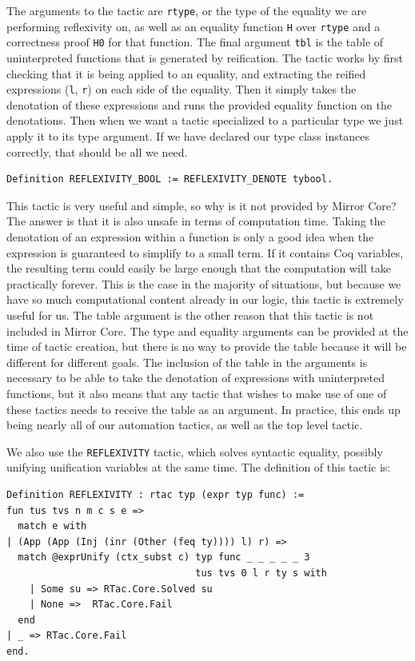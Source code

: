 \documentclass{puthesis}
\begin{document}
The arguments to the tactic are \lstinline|rtype|, or the type of the equality we are
performing reflexivity on, as well as an equality function \lstinline|H| over
\lstinline|rtype| and a correctness proof \lstinline|H0| for that function. The final
argument \lstinline|tbl| is the table of uninterpreted functions that is generated by reification.
 The
tactic works by first checking that it is being applied to an
equality, and extracting the reified expressions (\lstinline|l|, \lstinline|r|) on each side of the
equality. Then it simply takes the denotation of these expressions and
runs the provided equality function on the denotations. Then when we
want a tactic specialized to a particular type we just apply it to its
type argument. If we have declared our type class instances correctly,
that should be all we need.

\begin{lstlisting}
Definition REFLEXIVITY_BOOL := REFLEXIVITY_DENOTE tybool.
\end{lstlisting}

This tactic is very useful and simple, so why is it not provided by
Mirror Core? The answer is that it is also unsafe in terms of
computation time. Taking the denotation of an expression within a
function is only a good idea when the expression is guaranteed to
simplify to a small term. If it contains Coq variables, the resulting
term could easily be large enough that the computation will take
practically forever. This is the case in the majority of situations,
but because we have so much computational content already in our
logic, this tactic is extremely useful for us. The table argument is
the other reason that this tactic is not included in Mirror Core. The
type and equality arguments can be provided at the time of tactic
creation, but there is no way to provide the table because it will be
different for different goals. The inclusion of the table in the
arguments is necessary to be able to take the denotation of
expressions with uninterpreted functions, but it also means that any
tactic that wishes to make use of one of these tactics needs to
receive the table as an argument. In practice, this ends up being
nearly all of our automation tactics, as well as the top level tactic.

We also use the \lstinline|REFLEXIVITY| tactic, which solves syntactic
equality, possibly unifying unification variables at the same
time. The definition of this tactic is:

\begin{lstlisting}
Definition REFLEXIVITY : rtac typ (expr typ func) :=
fun tus tvs n m c s e => 
  match e with 
| (App (App (Inj (inr (Other (feq ty)))) l) r) =>
  match @exprUnify (ctx_subst c) typ func _ _ _ _ _ 3
                                 tus tvs 0 l r ty s with
    | Some su => RTac.Core.Solved su 
    | None =>  RTac.Core.Fail
  end
| _ => RTac.Core.Fail
end.
\end{lstlisting}
\end{document}
